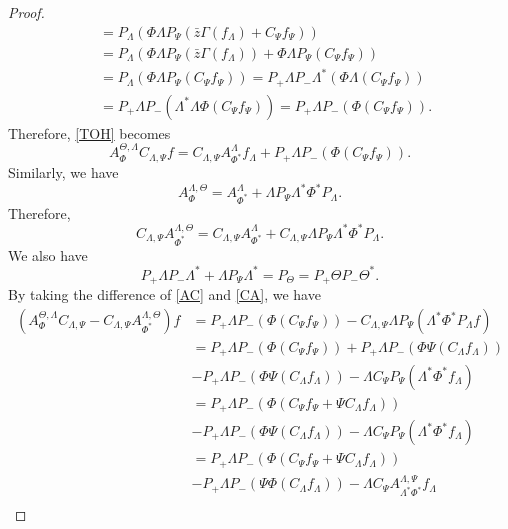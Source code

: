 \documentclass[12pt]{amsart}
\numberwithin{equation}{section}
\theoremstyle{definition}
\numberwithin{equation}{section}
\begin{document}
\begin{proof}
\begin{align*}
&=P_{\Lambda}(\Phi\Lambda P_{\Psi}(\bar z \Gamma (f_{\Lambda})+ C_{\Psi}f_{\Psi}))\\
&=P_{\Lambda}(\Phi\Lambda P_{\Psi}(\bar z \Gamma (f_{\Lambda}))+\Phi\Lambda P_{\Psi}( C_{\Psi}f_{\Psi}))\\
&=P_{\Lambda}(\Phi\Lambda P_{\Psi}( C_{\Psi}f_{\Psi}))=P_{+}\Lambda P_{-}\Lambda^{*}(\Phi\Lambda ( C_{\Psi}f_{\Psi}))\\
&=P_{+}\Lambda P_{-}(\Lambda^{*}\Lambda\Phi( C_{\Psi}f_{\Psi}))=P_{+}\Lambda P_{-}(\Phi ( C_{\Psi}f_{\Psi})).
\end{align*}
Therefore, \eqref{TOH} becomes
\begin{equation}\label{AC}
    A_{\Phi}^{\Theta,\Lambda}C_{\Lambda,\Psi}f
=C_{\Lambda,\Psi}A_{\Phi^{*}}^{\Lambda}f_{\Lambda}+P_{+}\Lambda P_{-}(\Phi ( C_{\Psi}f_{\Psi})).
\end{equation}
Similarly, we have
$$A_{\Phi}^{\Lambda,\Theta}=A_{\Phi^{*}}^{\Lambda}+\Lambda P_{\Psi}\Lambda^{*}\Phi^{*}P_{\Lambda}.$$
Therefore,
\begin{equation}\label{CA}
C_{\Lambda,\Psi}A_{\Phi^{*}}^{\Lambda,\Theta}=C_{\Lambda,\Psi}A_{\Phi^{*}}^{\Lambda}+C_{\Lambda,\Psi}\Lambda P_{\Psi}\Lambda^{*}\Phi^{*}P_{\Lambda}.
\end{equation}
We also have
$$P_{+}\Lambda P_{-}\Lambda^{*}+\Lambda P_{\Psi}\Lambda^{*}=P_{\Theta}=P_{+}\Theta P_{-}\Theta^{*}.$$
By taking the difference of \eqref{AC} and \eqref{CA}, we have
\begin{align*}
(A_{\Phi}^{\Theta,\Lambda}C_{\Lambda,\Psi}-C_{\Lambda,\Psi}A_{\Phi^{*}}^{\Lambda,\Theta})f
&=P_{+}\Lambda P_{-}(\Phi ( C_{\Psi}f_{\Psi}))-C_{\Lambda,\Psi}\Lambda P_{\Psi}(\Lambda^{*}\Phi^{*}P_{\Lambda}f)\\
&=P_{+}\Lambda P_{-}(\Phi ( C_{\Psi}f_{\Psi}))+P_{+}\Lambda P_{-}(\Phi \Psi( C_{\Lambda}f_{\Lambda}))\\
&-P_{+}\Lambda P_{-}(\Phi \Psi( C_{\Lambda}f_{\Lambda}))-\Lambda C_{\Psi}P_{\Psi}(\Lambda^{*}\Phi^{*}f_{\Lambda})\\
&=P_{+}\Lambda P_{-}(\Phi ( C_{\Psi}f_{\Psi}+\Psi C_{\Lambda}f_{\Lambda}))\\
&-P_{+}\Lambda P_{-}(\Phi \Psi( C_{\Lambda}f_{\Lambda}))-\Lambda C_{\Psi}P_{\Psi}(\Lambda^{*}\Phi^{*}f_{\Lambda})\\
&=P_{+}\Lambda P_{-}(\Phi ( C_{\Psi}f_{\Psi}+\Psi C_{\Lambda}f_{\Lambda}))\\
&-P_{+}\Lambda P_{-}(\Psi\Phi( C_{\Lambda}f_{\Lambda}))-\Lambda C_{\Psi}A_{\Lambda^{*}\Phi^{*}}^{\Lambda,\Psi}f_{\Lambda}\\

\end{align*}
\end{proof}
\end{document}

